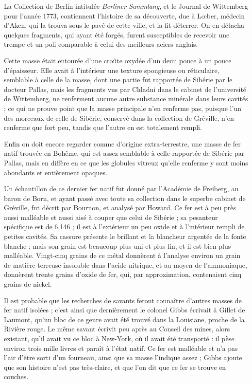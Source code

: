 \documentclass[a4paper, 12pt, oneside, french]{article}
\begin{document}
La Collection de Berlin intitulée \emph{Berliner Sammlang}, et le Journal de Wittemberg pour l'année 1773, contiennent l'histoire de sa découverte, due à Lœber, médecin d'Aken, qui la trouva sous le pavé de cette ville, et la fit déterrer. On en détacha quelques fragments, qui ayant été forgés, furent susceptibles de recevoir une trempe et un poli comparable à celui des meilleurs aciers anglais.

Cette masse était entourée d'une croûte oxydée d'un demi pouce à un pouce d'épaisseur. Elle avait à l'intérieur une texture spongieuse ou réticulaire, semblable à celle de la masse, dont une partie fut rapportée de Sibérie par le docteur Pallas, mais les fragments vus par Chladni dans le cabinet de l'université de Wittemberg, ne renferment aucune autre substance minérale dans leurs cavités ; ce qui ne prouve point que la masse principale n'en renferme pas, puisque l'un des morceaux de celle de Sibérie, conservé dans la collection de Gréville, n'en renferme que fort peu, tandis que l'autre en est totalement rempli.

Enfin on doit encore regarder comme d'origine extra-terrestre, une masse de fer natif trouvée en Bohême, qui est assez semblable à celle rapportée de Sibérie par Pallas, mais en diffère en ce que les globules vitreux qu'elle renferme y sont moins abondants et entièrement opaques.

Un échantillon de ce dernier fer natif fut donné par l'Académie de Freiberg, au baron de Born, et ayant passé avec toute sa collection dans le superbe cabinet de Gréville, fut décrit par Bournon, et analysé par Howard. Ce fer est à peu près aussi malléable et aussi aisé à couper que celui de Sibérie ; sa pesanteur spécifique est de 6,146 ; il est à l'extérieur un peu oxide et à l'intérieur rempli de petites cavités. Sa cassure présente le brillant et la blancheur argentée de la fonte blanche ; mais son grain est beaucoup plus uni et plus fin, et il est bien plus malléable. Vingt-cinq grains de ce métal donnèrent à l'analyse environ un grain de matière terreuse insoluble dans l'acide nitrique, et au moyen de l'ammoniaque, donnèrent trente grains d'oxide de fer, qui, par approximation, contenaient cinq grains de nickel.

Il est probable que les recherches de savants feront connaître d'autres masses de fer natif isolées ; c'est ainsi que dernièrement le colonel Gibbs écrivait à Gillet de Laumont, qu'un bloc de ce genre avait été trouvé dans la Louisiane, proche de la Rivière rouge. Le même savant écrivit peu après au Conseil des mines, alors existant, qu'il avait vu ce bloc à New-York, où il avait été transporté : il pèse environ trois mille livres et paraît à l'état natif. Ce fer est malléable et n'a pas l'air d'être sorti d'un fourneau, ainsi que sa masse l'indique assez ; Gibbs ajoute que son histoire n'est pas très-claire, et que l'on dit que ce fer se trouve en couches.
\end{document}

